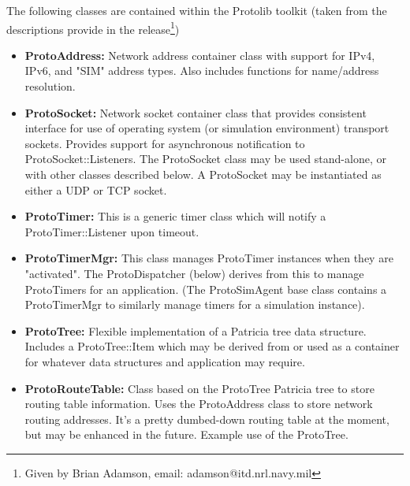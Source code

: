 The following classes are contained within the Protolib toolkit (taken from the descriptions provide in the release\footnote{Given by Brian Adamson, email: adamson@itd.nrl.navy.mil})

\begin{itemize}
\item \textbf{ProtoAddress:}    Network address container class with support
                 for IPv4, IPv6, and "SIM" address types.  Also
                 includes functions for name/address
                 resolution.

\item \textbf{ProtoSocket:}     Network socket container class that provides
                 consistent interface for use of operating
                 system (or simulation environment) transport
                 sockets. Provides support for asynchronous
                 notification to ProtoSocket::Listeners.  The
                 ProtoSocket class may be used stand-alone, or
                 with other classes described below.  A
                 ProtoSocket may be instantiated as either a
                 UDP or TCP socket.

\item \textbf{ProtoTimer:}      This is a generic timer class which will
                 notify a ProtoTimer::Listener upon timeout.
\item \textbf{ProtoTimerMgr:}   This class manages ProtoTimer instances when
                 they are "activated".  The ProtoDispatcher
                 (below) derives from this to manage
                 ProtoTimers for an application.  (The
                 ProtoSimAgent base class contains a
                 ProtoTimerMgr to similarly manage timers for a
                 simulation instance).

\item \textbf{ProtoTree: }      Flexible implementation of a Patricia tree
                 data structure.  Includes a ProtoTree::Item
                 which may be derived from or used as a
                 container for  whatever data structures and
                 application may require.

\item \textbf{ProtoRouteTable:} Class based on the ProtoTree Patricia tree to
                 store routing table information. Uses the
                 ProtoAddress class to store network routing
                 addresses.  It's a pretty dumbed-down routing
                 table at the moment, but may be enhanced in
                 the future.  Example use of the ProtoTree.


\end{itemize}
